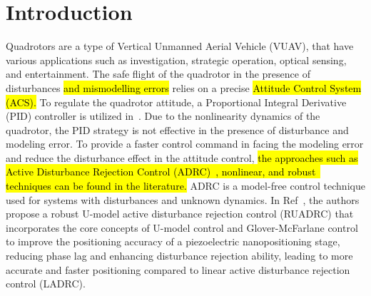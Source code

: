 \documentclass[3p]{elsarticle}
\begin{document}
\section{Introduction}\label{sec:intro}

\noindent Quadrotors are a type of Vertical Unmanned Aerial Vehicle (VUAV), that have various applications such as investigation, strategic operation, optical sensing, and entertainment. The safe flight of the quadrotor in the presence of disturbances \hl{and mismodelling errors} relies on a precise \hl{Attitude Control System (ACS).} To regulate the quadrotor attitude, a Proportional Integral Derivative (PID) controller is utilized in~\cite{article_Abdul, article_Bolandi}. Due to the nonlinearity dynamics of the quadrotor, the PID strategy is not effective in the presence of disturbance and modeling error.
To provide a faster control command in facing the modeling error and reduce the disturbance effect in the attitude control, \hl{the approaches such as Active Disturbance Rejection Control (ADRC)~{\cite{CHENG2023}}, nonlinear, and robust~\mbox{\cite{DING2022580, CORTESROMERO202063}}
 techniques can be found in the literature.} ADRC is a model-free control technique used for systems with disturbances and unknown dynamics. In Ref~\cite{WEI2022599}, the authors propose a robust U-model active disturbance rejection control (RUADRC) that incorporates the core concepts of U-model control and Glover-McFarlane control to improve the positioning accuracy of a piezoelectric nanopositioning stage, reducing phase lag and enhancing disturbance rejection ability, leading to more accurate and faster positioning compared to linear active disturbance rejection control (LADRC). 
\end{document}
